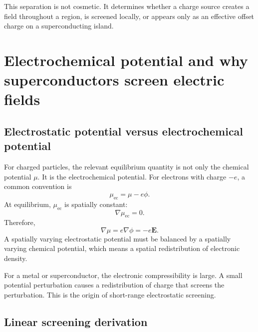 \documentclass[11pt]{article}
\newcommand{\Evec}{\mathbf{E}}
\newcommand{\muchem}{\mu}
\newcommand{\muec}{\mu_{\mathrm{ec}}}
\begin{document}
This separation is not cosmetic. It determines whether a charge source creates a field throughout a region, is screened locally, or appears only as an effective offset charge on a superconducting island.

\section{Electrochemical potential and why superconductors screen electric fields}

\subsection{Electrostatic potential versus electrochemical potential}

For charged particles, the relevant equilibrium quantity is not only the chemical potential $\muchem$. It is the electrochemical potential. For electrons with charge $-e$, a common convention is
\begin{equation}
\muec = \muchem - e\phi.
\label{eq:electron_electrochemical}
\end{equation}
At equilibrium, $\muec$ is spatially constant:
\begin{equation}
\nabla \muec = 0.
\end{equation}
Therefore,
\begin{equation}
\nabla\muchem = e\nabla\phi = -e\Evec.
\end{equation}
A spatially varying electrostatic potential must be balanced by a spatially varying chemical potential, which means a spatial redistribution of electronic density.

For a metal or superconductor, the electronic compressibility is large. A small potential perturbation causes a redistribution of charge that screens the perturbation. This is the origin of short-range electrostatic screening.

\subsection{Linear screening derivation}
\end{document}

